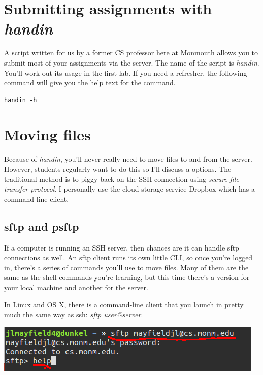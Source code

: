 \documentclass[]{tufte-handout}
\begin{document}
\section{Submitting assignments with \textit{handin}}

A script written for us by a former CS professor here at Monmouth allows you to submit most of your assignments via the server. The name of the script is \textit{handin}.  You'll work out its usage in the first lab.  If you need a refresher, the following command will give you the help text for the command.

\begin{verbatim}
handin -h
\end{verbatim}

\section{Moving files}

Because of \textit{handin}, you'll never really need to move files to and from the server.  However, students regularly want to do this so I'll discuss a options.  The traditional method is to piggy back on the SSH connection using \textit{secure file transfer protocol}. I personally use the cloud storage service Dropbox which has a command-line client. 

\subsection{sftp and psftp}

If a computer is running an SSH server, then chances are it can handle sftp connections as well.  An sftp client runs its own little CLI, so once you're logged in, there's a series of commands you'll use to move files. Many of them are the same as the shell commands you're learning, but this time there's a version for your local machine and another for the server.

In Linux and OS X, there is a command-line client that you launch in pretty much the same way as ssh: \textit{sftp user@server}. 

\vspace{.1in}
\begin{center}
\includegraphics[scale=.5]{linux-sftplogin.png}
\end{center}
\vspace{.1in}
\end{document}
